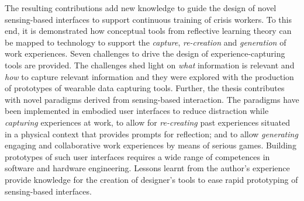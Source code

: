 The resulting contributions add new knowledge to guide the design of
novel sensing-based interfaces to support continuous training of crisis
workers. To this end, it is demonstrated how conceptual tools from
reflective learning theory can be mapped to technology to support the
\emph{capture}, \emph{re-creation} and \emph{generation} of work
experiences. Seven challenges to drive the design of
experience-capturing tools are provided. The challenges shed light on
\emph{what} information is relevant and \emph{how} to capture relevant
information and they were explored with the production of prototypes of
wearable data capturing tools. Further, the thesis contributes with
novel paradigms derived from sensing-based interaction. The paradigms
have been implemented in embodied user interfaces to reduce distraction
while \emph{capturing} experiences at work, to allow for
\emph{re-creating} past experiences situated in a physical context that
provides prompts for reflection; and to allow \emph{generating} engaging
and collaborative work experiences by means of serious games. Building
prototypes of such user interfaces requires a wide range of competences
in software and hardware engineering. Lessons learnt from the author's
experience provide knowledge for the creation of designer's tools to
ease rapid prototyping of sensing-based interfaces.

